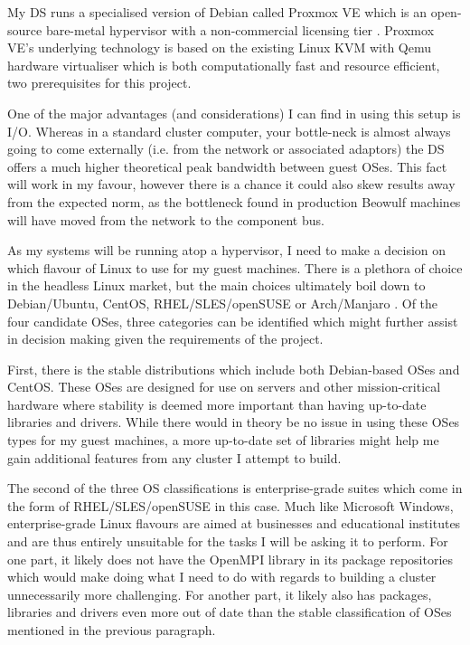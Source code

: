 \textbf{}

My DS runs a specialised version of Debian called Proxmox VE which is an open-source bare-metal hypervisor with a non-commercial licensing tier \cite{proxmox_2020}. Proxmox VE's underlying technology is based on the existing Linux KVM with Qemu hardware virtualiser which is both computationally fast and resource efficient, two prerequisites for this project.

One of the major advantages (and considerations) I can find in using this setup is I/O. Whereas in a standard cluster computer, your bottle-neck is almost always going to come externally (i.e. from the network or associated adaptors) the DS offers a much higher theoretical peak bandwidth between guest OSes. This fact will work in my favour, however there is a chance it could also skew results away from the expected norm, as the bottleneck found in production Beowulf machines will have moved from the network to the component bus.

\textbf{}

As my systems will be running atop a hypervisor, I need to make a decision on which flavour of Linux to use for my guest machines. There is a plethora of choice in the headless Linux market, but the main choices ultimately boil down to Debian/Ubuntu, CentOS, RHEL/SLES/openSUSE or Arch/Manjaro \cite{distrowatch_2020}. Of the four candidate OSes, three categories can be identified which might further assist in decision making given the requirements of the project.

First, there is the stable distributions which include both Debian-based OSes and CentOS. These OSes are designed for use on servers and other mission-critical hardware where stability is deemed more important than having up-to-date libraries and drivers. While there would in theory be no issue in using these OSes types for my guest machines, a more up-to-date set of libraries might help me gain additional features from any cluster I attempt to build.

The second of the three OS classifications is enterprise-grade suites which come in the form of RHEL/SLES/openSUSE in this case. Much like Microsoft Windows, enterprise-grade Linux flavours are aimed at businesses and educational institutes and are thus entirely unsuitable for the tasks I will be asking it to perform. For one part, it likely does not have the OpenMPI library in its package repositories which would make doing what I need to do with regards to building a cluster unnecessarily more challenging. For another part, it likely also has packages, libraries and drivers even more out of date than the stable classification of OSes mentioned in the previous paragraph.

